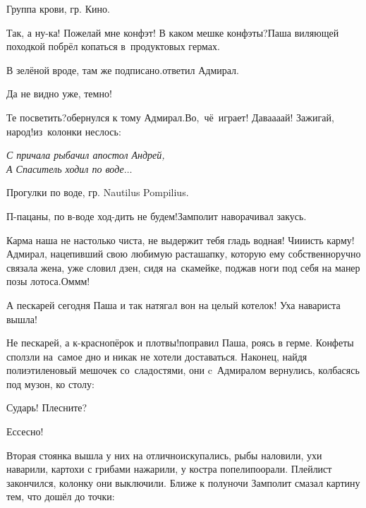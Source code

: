 {\raggedleft \scriptsize \mdash Группа крови, гр. Кино. \par}

\vspace{0.1cm}

\diagdash Так, а ну-ка! Пожелай мне конфэт! В каком мешке конфэты?\mdash Паша виляющей походкой побрёл копаться в~продуктовых гермах.

\diagdash В зелёной вроде, там же подписано.\mdash ответил Адмирал.

\diagdash Да не видно уже, темно!

\diagdash Те посветить?\mdash обернулся к тому Адмирал.\mdash Во,~чё~играет! Дава\sdash а\sdash а\sdash ай! Зажигай, народ!\mdash из~колонки неслось:

\vspace{0.1cm}
\noindent\textit{%
	\hspace*{2.5cm}С причала рыбачил апостол Андрей,\\	
	\hspace*{2.5cm}А Спаситель ходил по воде$\ldots$%
}

{\raggedleft \scriptsize \mdash Прогулки по воде, гр. Nautilus Pompilius. \par}

\vspace{0.1cm}

\diagdash П-пацаны, по в-воде ход-дить не будем!\mdash Замполит наворачивал закусь.

\diagdash Карма наша не настолько чиста, не выдержит тебя гладь водная! Чи\sdash и\sdash исть карму!\mdash Адмирал, нацепивший свою любимую раста\sdash шапку, которую ему собственноручно связала жена, уже словил дзен, сидя на~скамейке, поджав ноги под себя на манер позы лотоса.\mdash Ом\sdash м\sdash м!

\diagdash А пескарей сегодня Паша и так натягал вон на целый котелок! Уха навариста вышла!

\diagdash Не пескарей, а к-краснопёрок и плотвы!\mdash поправил Паша, роясь в герме. Конфеты сползли на~самое дно и никак не хотели доставаться. Наконец, найдя полиэтиленовый мешочек со~сладостями, они c~Адмиралом вернулись, колбасясь под музон, ко столу:

\diagdash Сударь! Плесните?

\diagdash Ессесно!

Вторая стоянка вышла у них на отлично\mdash искупались, рыбы наловили, ухи наварили, картохи с грибами нажарили, у костра попели\sdash поорали. Плейлист закончился, колонку они выключили. Ближе к полуночи Замполит смазал картину тем, что дошёл до точки:

